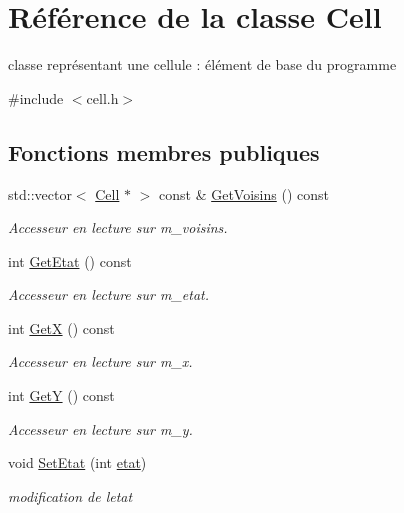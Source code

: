 \hypertarget{class_cell}{}\section{Référence de la classe Cell}
\label{class_cell}


classe représentant une cellule \+: élément de base du programme  




{\ttfamily \#include $<$cell.\+h$>$}

\subsection*{Fonctions membres publiques}
\begin{DoxyCompactItemize}
\item 
std\+::vector$<$ \mbox{\hyperlink{class_cell}{Cell}} $\ast$ $>$ const  \& \mbox{\hyperlink{class_cell_a5c2a7b09dcb8afed0040ebdc4267408d}{Get\+Voisins}} () const
\begin{DoxyCompactList}\small\item\em Accesseur en lecture sur m\+\_\+voisins. \end{DoxyCompactList}\item 
int \mbox{\hyperlink{class_cell_a7640093c787979958fbb772e4fccdffa}{Get\+Etat}} () const
\begin{DoxyCompactList}\small\item\em Accesseur en lecture sur m\+\_\+etat. \end{DoxyCompactList}\item 
int \mbox{\hyperlink{class_cell_a3af5ea9b9e031151e16009b22118b07a}{GetX}} () const
\begin{DoxyCompactList}\small\item\em Accesseur en lecture sur m\+\_\+x. \end{DoxyCompactList}\item 
int \mbox{\hyperlink{class_cell_a3668c9664cadb1b94a632d497fa493c5}{GetY}} () const
\begin{DoxyCompactList}\small\item\em Accesseur en lecture sur m\+\_\+y. \end{DoxyCompactList}\item 
void \mbox{\hyperlink{class_cell_a33dac87ec7294fdb4c67b8b430ea0946}{Set\+Etat}} (int \mbox{\hyperlink{cell_8h_ae60adcb558b7f2142c3aa2dd94aaa535}{etat}})
\begin{DoxyCompactList}\small\item\em modification de l\textquotesingle{}etat \end{DoxyCompactList}\item 

\end{DoxyCompactItemize}
